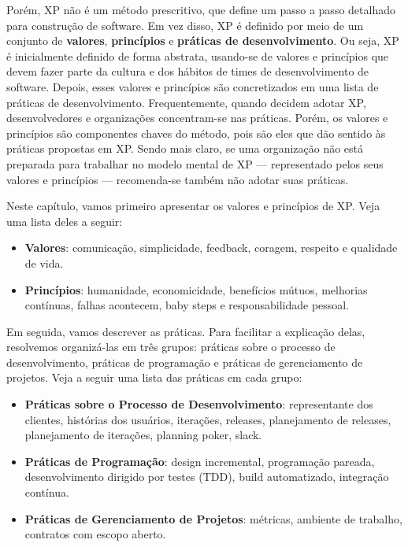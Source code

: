 \documentclass[
  11pt,
  twoside]{book}
\begin{document}
Porém, XP não é um método prescritivo, que define um passo a passo
detalhado para construção de software. Em vez disso, XP é definido por
meio de um conjunto de \textbf{valores}, \textbf{princípios} e
\textbf{práticas de desenvolvimento}. Ou seja, XP é inicialmente
definido de forma abstrata, usando-se de valores e princípios que devem
fazer parte da cultura e dos hábitos de times de desenvolvimento de
software. Depois, esses valores e princípios são concretizados em uma
lista de práticas de desenvolvimento. Frequentemente, quando decidem
adotar XP, desenvolvedores e organizações concentram-se nas práticas.
Porém, os valores e princípios são componentes chaves do método, pois
são eles que dão sentido às práticas propostas em XP. Sendo mais claro,
se uma organização não está preparada para trabalhar no modelo mental de
XP --- representado pelos seus valores e princípios --- recomenda-se
também não adotar suas práticas.

Neste capítulo, vamos primeiro apresentar os valores e princípios de XP.
Veja uma lista deles a seguir:

\begin{itemize}
\item
  \textbf{Valores}: comunicação, simplicidade, feedback, coragem,
  respeito e qualidade de vida.
\item
  \textbf{Princípios}: humanidade, economicidade, benefícios mútuos,
  melhorias contínuas, falhas acontecem, baby steps e responsabilidade
  pessoal.
\end{itemize}

Em seguida, vamos descrever as práticas. Para facilitar a explicação
delas, resolvemos organizá-las em três grupos: práticas sobre o processo
de desenvolvimento, práticas de programação e práticas de gerenciamento
de projetos. Veja a seguir uma lista das práticas em cada grupo:

\begin{itemize}
\item
  \textbf{Práticas sobre o Processo de Desenvolvimento}: representante
  dos clientes, histórias dos usuários, iterações, releases,
  planejamento de releases, planejamento de iterações, planning poker,
  slack.
\item
  \textbf{Práticas de Programação}: design incremental, programação
  pareada, desenvolvimento dirigido por testes (TDD), build
  automatizado, integração contínua.
\item
  \textbf{Práticas de Gerenciamento de Projetos}: métricas, ambiente de
  trabalho, contratos com escopo aberto.
\end{itemize}
\end{document}
